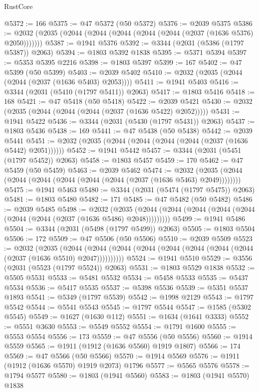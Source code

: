 \begin{lexlean}{RustCore}
\begin{coremodule}
@5372 := 166
@5375 := @47 @5372 (@50 @5372)
@5376 := @2039 @5375
@5386 := @2032 (@2035 (@2044 (@2044 (@2044 (@2044 (@2044 (@2037 (@1636 @5376) @2050)))))))
@5387 := @1941 @5376
@5392 := @3344 (@2031 (@5386 (@1797 @5387)) @2063)
@5394 := @1803 @5392 @1838
@5395 := @5371 @5394
@5397 := @5353 @5395 @2216
@5398 := @1803 @5397
@5399 := 167
@5402 := @47 @5399 (@50 @5399)
@5403 := @2039 @5402
@5410 := @2032 (@2035 (@2044 (@2044 (@2037 (@1636 @5403) @2053))))
@5411 := @1941 @5403
@5416 := @3344 (@2031 (@5410 (@1797 @5411)) @2063)
@5417 := @1803 @5416
@5418 := 168
@5421 := @47 @5418 (@50 @5418)
@5422 := @2039 @5421
@5430 := @2032 (@2035 (@2044 (@2044 (@2044 (@2037 (@1636 @5422) @2052)))))
@5431 := @1941 @5422
@5436 := @3344 (@2031 (@5430 (@1797 @5431)) @2063)
@5437 := @1803 @5436
@5438 := 169
@5441 := @47 @5438 (@50 @5438)
@5442 := @2039 @5441
@5451 := @2032 (@2035 (@2044 (@2044 (@2044 (@2044 (@2037 (@1636 @5442) @2051))))))
@5452 := @1941 @5442
@5457 := @3344 (@2031 (@5451 (@1797 @5452)) @2063)
@5458 := @1803 @5457
@5459 := 170
@5462 := @47 @5459 (@50 @5459)
@5463 := @2039 @5462
@5474 := @2032 (@2035 (@2044 (@2044 (@2044 (@2044 (@2044 (@2044 (@2037 (@1636 @5463) @2049))))))))
@5475 := @1941 @5463
@5480 := @3344 (@2031 (@5474 (@1797 @5475)) @2063)
@5481 := @1803 @5480
@5482 := 171
@5485 := @47 @5482 (@50 @5482)
@5486 := @2039 @5485
@5498 := @2032
    (@2035 (@2044 (@2044 (@2044 (@2044 (@2044 (@2044 (@2044 (@2037 (@1636 @5486) @2048)))))))))
@5499 := @1941 @5486
@5504 := @3344 (@2031 (@5498 (@1797 @5499)) @2063)
@5505 := @1803 @5504
@5506 := 172
@5509 := @47 @5506 (@50 @5506)
@5510 := @2039 @5509
@5523 := @2032
    (@2035
      (@2044 (@2044 (@2044 (@2044 (@2044 (@2044 (@2044 (@2044 (@2037 (@1636 @5510) @2047))))))))))
@5524 := @1941 @5510
@5529 := @3556 (@2031 (@5523 (@1797 @5524)) @2063)
@5531 := @1803 @5529 @1838
@5532 := @5505 @5531
@5533 := @5481 @5532
@5534 := @5458 @5533
@5535 := @5437 @5534
@5536 := @5417 @5535
@5537 := @5398 @5536
@5539 := @5351 @5537 @1893
@5541 := @5349 (@1797 @5539)
@5542 := @1998 @2129
@5543 := @1797 @5542
@5544 := @5541 @5543
@5545 := @1797 @5544
@5547 := @1585 (@5302 @5545)
@5549 := @1627 (@1630 @112)
@5551 := @1634 (@1641 @3333)
@5552 := @5551 @3630
@5553 := @5549 @5552
@5554 := @1791 @1600
@5555 := @5553 @5554
@5556 := 173
@5559 := @47 @5556 (@50 @5556)
@5560 := @1914 @5559
@5565 := @1911 (@1912 (@1636 @5560) @1919 @1807)
@5566 := 174
@5569 := @47 @5566 (@50 @5566)
@5570 := @1914 @5569
@5576 := @1911 (@1912 (@1636 @5570) @1919 @2073) @1796
@5577 := @5565 @5576
@5578 := @1794 @5577
@5580 := @1803 (@1941 @5560)
@5583 := @1803 (@1941 @5570) @1838

\end{coremodule}
\end{lexlean}
